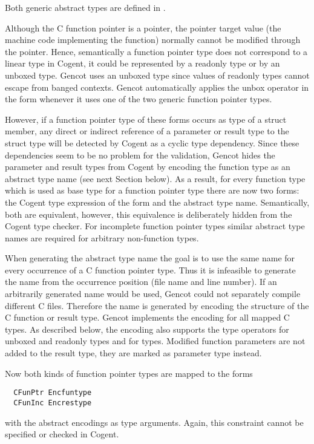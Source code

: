 Both generic abstract types are defined in .

Although the C function pointer is a pointer, the pointer target value (the machine code implementing the function) 
normally cannot be modified through the pointer. Hence, semantically a function pointer type does not correspond to a linear type
in Cogent, it could be represented by a readonly type or by an unboxed type. Gencot uses an unboxed type
since values of readonly types cannot escape from banged contexts. Gencot automatically applies the 
unbox operator in the form  whenever it uses one of the two generic function pointer types.

However, if a function pointer type of these forms occurs as type of a struct member, any direct or indirect reference of a
parameter or result type to the struct type will be detected by Cogent as a cyclic type dependency. Since 
these dependencies seem to be no problem for the validation, Gencot hides the parameter and result types from
Cogent by encoding the function type as an abstract type name (see next Section below). As a result, for 
every function type which is used as base type for a function pointer type there are now two forms: the Cogent
type expression of the form  and the abstract type name. Semantically, both are equivalent, however,
this equivalence is deliberately hidden from the Cogent type checker. For incomplete function pointer types similar
abstract type names are required for arbitrary non-function types.

When generating the abstract type name the goal is to use the same name 
for every occurrence of a C function pointer type. Thus it is infeasible to generate the name from 
the occurrence position (file name and line number). If an arbitrarily generated name would be used, 
Gencot could not separately compile different C files. Therefore the name is generated by encoding the structure of the 
C function or result type. Gencot implements the encoding for all mapped C types. As described
below, the encoding also supports the type operators for unboxed and readonly types and for  types.
Modified function parameters are not added to the result type, they are marked as parameter type instead.

Now both kinds of function pointer types are mapped to the forms
\begin{verbatim}
  CFunPtr Encfuntype
  CFunInc Encrestype
\end{verbatim}
with the abstract encodings as type arguments. Again, this constraint cannot be specified or checked in Cogent.

